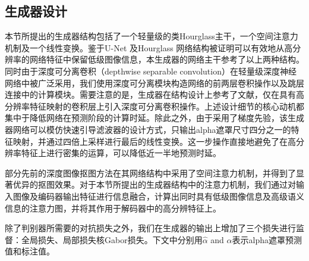 \subsection{生成器设计}
本节所提出的生成器结构包括了一个轻量级的类Hourglass\cite{newell2016stacked}主干，一个空间注意力机制及一个线性变换。鉴于U-Net\cite{ronneberger2015u} 及Hourglass \cite{newell2016stacked}网络结构被证明可以有效地从高分辨率的网络特征中保留低级图像信息，本生成器的网络主干参考了以上两种结构。同时由于深度可分离卷积（depthwise separable convolution）在轻量级深度神经网络中被广泛采用\cite{chollet2017xception,howard2017mobilenets,zhang2018shufflenet,sandler2018mobilenetv2}，我们使用深度可分离模块构造网络的前两层卷积操作以及跳层连接中的计算模块。需要注意的是，生成器在结构设计上参考了文献\parencite{nekrasov2018real}，仅在具有高分辨率特征映射的卷积层上引入深度可分离卷积操作。上述设计细节的核心动机都集中于降低网络在预测阶段的计算时延。除此之外，由于采用了梯度先验，该生成器网络可以模仿快速引导滤波器\cite{he2015fast}的设计方式，只输出alpha遮罩尺寸四分之一的特征映射，并通过四倍上采样进行最后的线性变换。这一步操作直接地避免了在高分辨率特征上进行密集的运算，可以降低近一半地预测时延。

部分先前的深度图像抠图方法\cite{chen2018semantic,zhu2017fast}在其网络结构中采用了空间注意力机制\cite{xu2015show}，并得到了显著优异的抠图效果。对于本节所提出的生成器结构中的注意力机制，我们通过对输入图像及编码器输出特征进行信息融合，计算出同时具有低级图像信息及高级语义信息的注意力图，并将其作用于解码器中的高分辨特征上。

除了判别器所需要的对抗损失之外，我们在生成器的输出上增加了三个损失进行监督：全局损失、局部损失核Gabor损失。下文中分别用$ \hat{\alpha} $ and $ {\alpha} $表示alpha遮罩预测值和标注值。

